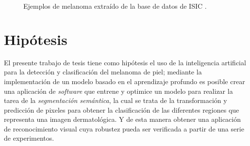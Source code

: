 \begin{figure}[b]
    \centering
    \hspace{-0.4cm}
    \caption{Ejemplos de melanoma extraído de la base de datos de ISIC \citep{isic_skin}.}
    
  \end{figure}


\section{Hipótesis}
El presente trabajo de tesis tiene como hipótesis el uso de la inteligencia artificial para la detección y clasificación del melanoma de piel; mediante la implementación de un modelo basado en el aprendizaje profundo es posible crear una aplicación de \emph{software} que entrene y optimice un modelo para realizar la tarea de la \emph{segmentación semántica}, la cual se trata de la transformación y predicción de pixeles para obtener la clasificación de las diferentes regiones que representa una imagen dermatológica. Y de esta manera obtener una aplicación de reconocimiento visual cuya robustez pueda ser verificada a partir de una serie de experimentos.



